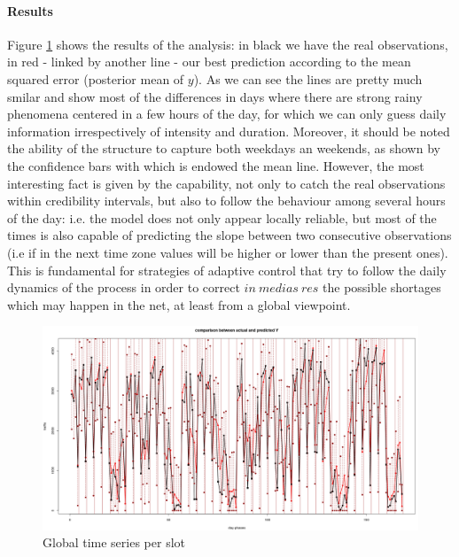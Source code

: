 \documentclass[11pt,twoside]{report}
\begin{document}
\paragraph{Results}
Figure \ref{fig:time series} shows the results of the analysis: in black we have the real observations, in red - linked by another line - our best prediction according to the mean squared error (posterior mean of $ y $). As we can see the lines are pretty much smilar and show most of the differences in days where there are strong rainy phenomena centered in a few hours of the day, for which we can only guess daily information irrespectively of intensity and duration. Moreover, it should be noted the ability of the structure to capture both weekdays an weekends, as shown by the confidence bars with which is endowed the mean line. However, the most interesting fact is given by the capability, not only to catch the real observations within credibility intervals, but also to follow the behaviour among several hours of the day: i.e. the model does not only appear locally reliable, but most of the times is also capable of predicting the slope between two consecutive observations (i.e if in the next time zone values will be higher or lower than the present ones). This is fundamental for strategies of adaptive control that try to follow the daily dynamics of the process in order to correct $ in\ medias\ res $ the possible shortages which may happen in the net, at least from a global viewpoint.

\begin{figure}[H]
	\centering
	\includegraphics[width=150 mm]{pictures/Time_series.png}
	\caption{Global time series per slot}
	\label{fig:time series}
\end{figure}%
\end{document}
